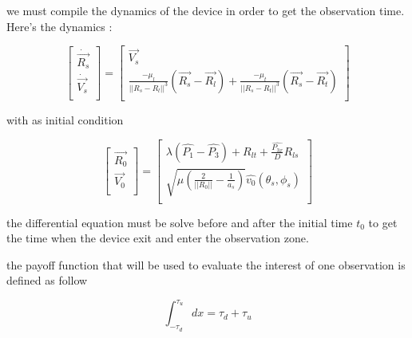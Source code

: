 \documentclass{article} %
\begin{document}
		
		
		
		we must compile the dynamics of the device in order to get the observation time. Here's the dynamics : 
		
		$$
		\begin{bmatrix}
			\dot{\overrightarrow{R_{s}}}\\
			\dot{\overrightarrow{V_{s}}}\\
		\end{bmatrix} =\begin{bmatrix}
			\overrightarrow{V_{s}}\\
			\frac{-\mu_l }{||R_{s}-R_{l} ||^{3}}(\overrightarrow{R_{s}}-\overrightarrow{R_{l}}) + \frac{-\mu_t }{||R_{s}-R_{t} ||^{3}}(\overrightarrow{R_{s}}-\overrightarrow{R_{t}})\\
		\end{bmatrix}
		$$
		
		with as initial condition
		
		$$
		\begin{bmatrix}
			\overrightarrow{R_{0}}\\
			\overrightarrow{V_{0}}\\
		\end{bmatrix} =\begin{bmatrix}
			\lambda \left(\widehat{P_{1}} -\widehat{P_{3}}\right) +R_{lt} +\frac{\widehat{P_{3x}}}{D} R_{ls}\\
			\sqrt{\mu \left(\frac{2}{||R_{0} ||} -\frac{1}{a_s}\right)}\widehat{v_{0}}( \theta _{s} ,\phi _{s})\\
		\end{bmatrix}
		$$
		
		the differential equation must be solve before and after the initial time $t_0$ to get the time when the device exit and enter the observation zone.
		
		the payoff function that will be used to evaluate the interest of one observation is defined as follow
		
		$$
		\int_{-\tau_d}^{\tau_u}dx=\tau_d+\tau_u
		$$
		
\end{document}
